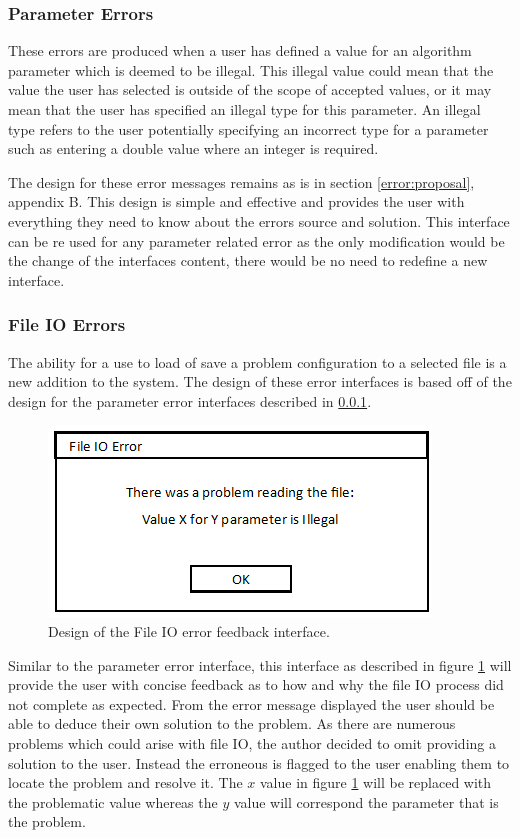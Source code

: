 \subsubsection{Parameter Errors}
\label{paramerror}
These errors are produced when a user has defined a value for an algorithm parameter which is deemed to be illegal. This illegal value could mean that the value the user has selected is outside of the scope of accepted values, or it may mean that the user has specified an illegal type for this parameter. An illegal type refers to the user potentially specifying an incorrect type for a parameter such as entering a double value where an integer is required.

The design for these error messages remains as is in section \ref{error:proposal}, appendix B. This design is simple and effective and provides the user with everything they need to know about the errors source and solution. This interface can be re used for any parameter related error as the only modification would be the change of the interfaces content, there would be no need to redefine a new interface.

\subsubsection{File IO Errors}

The ability for a use to load of save a problem configuration to a selected file is a new addition to the system. The design of these error interfaces is based off of the design for the parameter error interfaces described in \ref{paramerror}. 

\begin{figure}[H]
\centering
\includegraphics[scale=0.7]{Images/chapter4/IOError}
\caption{Design of the File IO error feedback interface.}
\label{fig:ioErrors}
\end{figure}

Similar to the parameter error interface, this interface as described in figure \ref{fig:ioErrors} will provide the user with concise feedback as to how and why the file IO process did not complete as expected. From the error message displayed the user should be able to deduce their own solution to the problem. As there are numerous problems which could arise with file IO, the author decided to omit providing a solution to the user. Instead the erroneous is flagged to the user enabling them to locate the problem and resolve it. The $x$ value in figure \ref{fig:ioErrors} will be replaced with the problematic value whereas the $y$ value will correspond the parameter that is the problem.


